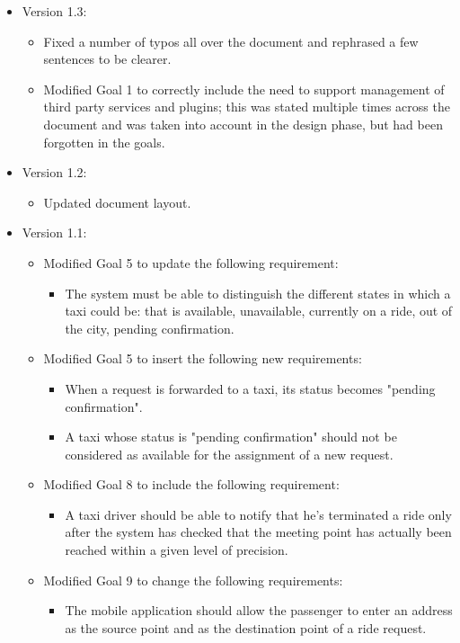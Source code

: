 \begin{itemize}
	\item Version 1.3:
	\begin{itemize}
		\item Fixed a number of typos all over the document and rephrased a few sentences to be clearer. 
		\item Modified Goal 1 to correctly include the need to support management of third party services and plugins; this was stated multiple times across the document and was taken into account in the design phase, but had been forgotten in the goals.
	\end{itemize}
	\item Version 1.2:
	\begin{itemize}
		\item Updated document layout.
	\end{itemize}
	\item Version 1.1:
	\begin{itemize}
	\item Modified Goal 5 to update the following requirement:
	\begin{itemize}
	\item The system must be able to distinguish the different states in which a taxi could be: that is available, unavailable, currently on a ride, out of the city, pending confirmation.
	\end{itemize}
	\item Modified Goal 5 to insert the following new requirements:
	\begin{itemize}
		\item When a request is forwarded to a taxi, its status becomes "pending confirmation". 
		\item A taxi whose status is "pending confirmation" should not be considered as available for the assignment of a new request.
	\end{itemize}
	\item Modified Goal 8 to include the following requirement: 
	\begin{itemize}
	\item A taxi driver should be able to notify that he's terminated a ride only after the system has checked that the meeting point has actually been reached within a given level of precision.
	\end{itemize}
	\item Modified Goal 9 to change the following requirements:
	\begin{itemize}
	\item The mobile application should allow the passenger to enter an address as the source point and as the destination point of a ride request.

\end{itemize}
\end{itemize}
\end{itemize}
